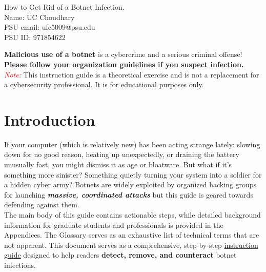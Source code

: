 \documentclass{article}
\newcommand{\titlefont}{\fontfamily{ppl}\selectfont}
\begin{document}
\begin{titlepage}
  \vspace*{160pt}
  \begin{center}
    {\titlefont \Huge How to Get Rid of a Botnet Infection.}\\[1cm]
    {\LARGE Name: UC Choudhary\\[1cm]}
    {\LARGE PSU email: ufc5009@psu.edu\\[1cm]}
    {\LARGE PSU ID: 971854622\\[1cm]}
  \end{center}
  \thispagestyle{fancy}
  \vspace*{\fill}
\end{titlepage}

\tableofcontents
\newpage

\begin{tcolorbox}[
  colback=backcolour,
  colframe=red!75!black,
  title={Disclaimer},
  fonttitle=\bfseries\large\centering,
  arc=4mm,
  boxrule=1pt,
  left=10pt, right=10pt,
  top=10pt, bottom=10pt,
  enhanced
]
\textbf{Malicious use of a botnet} is a cybercrime and a serious criminal offense!\\[2mm]
\textbf{Please follow your organization guidelines if you suspect infection.} \\[2mm]
\textit{\textcolor{red}{Note:}} This instruction guide is a theoretical exercise and is not a replacement for a cybersecurity professional.
It is for educational purposes only.
\end{tcolorbox}

\section{Introduction}
\noindent If your computer (which is relatively new) has been acting strange lately: slowing down for no good reason, heating up unexpectedly, or draining the battery unusually fast, you might dismiss it as age or bloatware. But what if it's something more sinister? Something quietly turning your system into a soldier for a hidden cyber army?
\noindent Botnets are widely exploited by organized hacking groups for launching \textbf{\textit{massive, coordinated attacks}} but this guide is geared towards defending against them.\\
The main body of this guide contains actionable steps, while detailed background information for graduate students and professionals is provided in the Appendices. The Glossary serves as an exhaustive list of technical terms that are not apparent. This document serves as a comprehensive, step-by-step \underline{instruction guide} designed to help readers \textbf{detect, remove, and counteract} botnet infections. 
\end{document}
